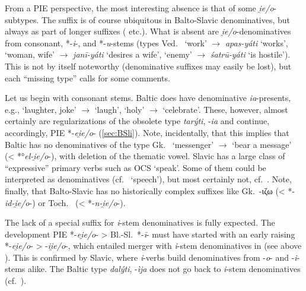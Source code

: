 \documentclass[output=paper,colorlinks,citecolor=brown]{langscibook}
\begin{document}
From a PIE perspective, the most interesting absence is that of some \textit{i̯e/o}-subtypes.  The suffix  is of course ubiquitous in Balto-Slavic denominatives, but always as part of longer suffixes ( etc.). What is absent are \textit{i̯e/o}-denominatives  from consonant, *-\textit{i}-, and *-\textit{u}-stems (types Ved.\  ‘work’ $\rightarrow$ \textit{apas-yáti} ‘works’,  ‘woman, wife’ $\rightarrow$ \textit{janī-yáti} ‘desires a wife’,  ‘enemy’ $\rightarrow$ \textit{\textit{śatrū-yáti}}  ‘is hostile’). This is not by itself noteworthy (denominative suffixes may easily be lost), but each “missing type” calls for some comments.

Let us begin with consonant stems. Baltic does have denominative \textit{ia}-presents, e.g.,  ‘laughter, joke’ $\rightarrow$  ‘laugh’,  ‘holy’ $\rightarrow$  ‘celebrate’. These, however, almost certainly are regularizations of the obsolete type \textit{tarýti}, -\textit{ia} and continue, accordingly, PIE *-\textit{ei̯e/o}- (\ref{sec:BSli}). Note, incidentally, that this implies that Baltic has no denominatives of the type Gk.\  ‘messenger’ $\rightarrow$  ‘bear a message’ (< *°\textit{el-i̯e/o}-), with deletion of the thematic vowel. Slavic has a large class of “expressive” primary verbs  such as OCS  ‘speak’. Some of them could be interpreted as denominatives (cf.\  ‘speech’), but most certainly not, cf.\ \citet[328--346]{Vaillant1966}. Note, finally, that Balto-Slavic has no historically complex suffixes like Gk.\ -ιζω  (< *-\textit{id-i̯e/o}-) or Toch.\  (< *-\textit{n-i̯e/o}-).

The lack of a special suffix for \textit{i}-stem denominatives  is fully expected. The development PIE *-\textit{ei̯e/o}- > Bl.-Sl.\ *-\textit{ī}- must have started with an early raising \mbox{*-\textit{ei̯e/o}-} > \mbox{-\textit{ii̯e/o}-,} which entailed merger with \textit{i}-stem denominatives  in  (see above ). This is confirmed by Slavic, where \textit{i}-verbs build denominatives from -\textit{o}- and -\textit{i}-stems alike. The Baltic type \textit{dalýti}, -\textit{ìja} does not go back to \textit{i}-stem denominatives (cf.\ \citealt{VillanuevaSvensson2023b}).
\end{document}
